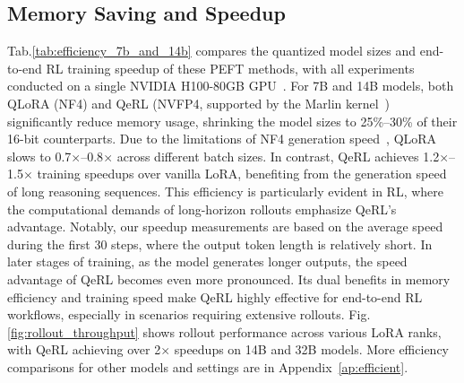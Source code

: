 \subsection{Memory Saving and Speedup}
Tab.\ref{tab:efficiency_7b_and_14b} compares the quantized model sizes and end-to-end RL training speedup of these PEFT methods, with all experiments conducted on a single NVIDIA H100-80GB GPU~\citep{noauthor_nvidia_nodate}. For 7B and 14B models, both QLoRA (NF4) and QeRL (NVFP4, supported by the Marlin kernel~\citep{frantar2024marlin}) significantly reduce memory usage, shrinking the model sizes to 25\%–30\% of their 16-bit counterparts. Due to the limitations of NF4 generation speed~\citep{egashira2024exploiting}, QLoRA slows to 0.7$\times$–0.8$\times$ across different batch sizes. In contrast, QeRL achieves 1.2$\times$–1.5$\times$ training speedups over vanilla LoRA, benefiting from the generation speed of long reasoning sequences. This efficiency is particularly evident in RL, where the computational demands of long-horizon rollouts emphasize QeRL's advantage. Notably, our speedup measurements are based on the average speed during the first 30 steps, where the output token length is relatively short. In later stages of training, as the model generates longer outputs, the speed advantage of QeRL becomes even more pronounced. Its dual benefits in memory efficiency and training speed make QeRL highly effective for end-to-end RL workflows, especially in scenarios requiring extensive rollouts. Fig.\ref{fig:rollout_throughput} shows rollout performance across various LoRA ranks, with QeRL achieving over 2$\times$ speedups on 14B and 32B models. More efficiency comparisons for other models and settings are in Appendix~\ref{ap:efficient}. 
